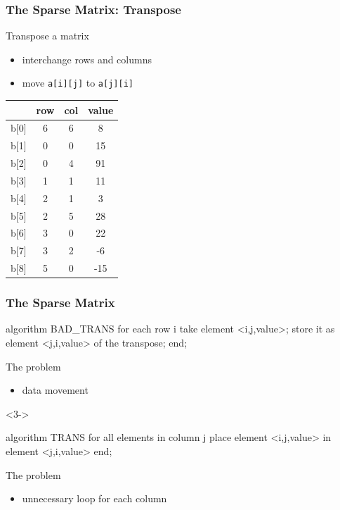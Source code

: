 \documentclass[newPxFont,sthlmFooter,nooffset]{beamer}
\begin{document}
\begin{frame}[t, fragile]
  \frametitle{The Sparse Matrix: Transpose}
Transpose a matrix
\begin{itemize}
\item interchange rows and columns
\item move \texttt{a[i][j]} to \texttt{a[j][i]}
\end{itemize}
  \begin{center}
    \begin{tabular}{r c c c}
      & row & col & value \\ \hline
      b[0]&  6  &  6  &   8   \\
      b[1]&  0  &  0  &  15   \\ 
      b[2]&  0  &  4  &  91   \\ 
      b[3]&  1  &  1  &  11   \\ 
      b[4]&  2  &  1  &   3   \\ 
      b[5]&  2  &  5  &  28   \\ 
      b[6]&  3  &  0  &  22   \\ 
      b[7]&  3  &  2  &  -6   \\ 
      b[8]&  5  &  0  &  -15   \\ 
    \end{tabular}
  \end{center}
\end{frame}

\begin{frame}[t, fragile]
  \frametitle{The Sparse Matrix}
\begin{codedef}
algorithm BAD_TRANS 
for each row i
    take element <i,j,value>;
    store it as element <j,i,value> of the transpose; 
end;  
\end{codedef}
The problem
\begin{itemize}
\item <2-> data movement
\end{itemize}
\begin{uncoverenv}<3->
\begin{codedef}
algorithm TRANS
for all elements in column j
    place element <i,j,value> in element <j,i,value> end;
\end{codedef}
The problem
\end{uncoverenv}
\begin{itemize}
\item <4-> unnecessary loop for each column
\end{itemize}
\end{frame}
\end{document}

